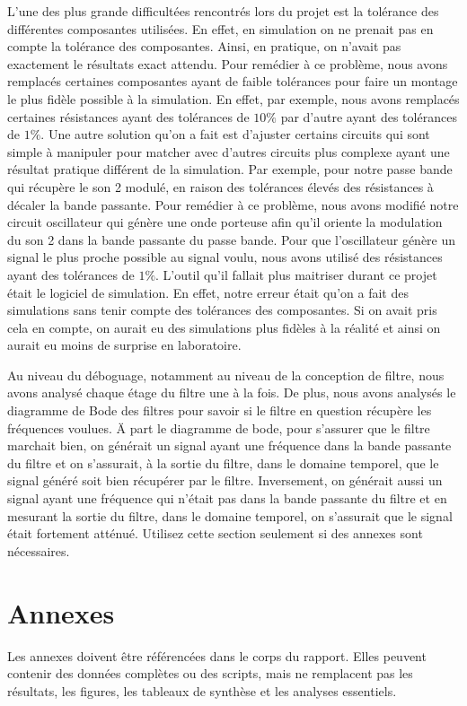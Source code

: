 \documentclass[11pt,letterpaper]{article}
\begin{document}
    L'une des plus grande difficultées rencontrés lors du projet est la tolérance des différentes composantes utilisées. En effet, en simulation on ne prenait pas en 
    compte la tolérance des composantes. Ainsi, en pratique, on n'avait pas exactement le résultats exact attendu. Pour remédier à ce problème, nous avons remplacés certaines composantes 
    ayant de faible tolérances pour faire un montage le plus fidèle possible à la simulation. En effet, par exemple, nous avons remplacés certaines résistances ayant des tolérances de 
    $10\%$ par d'autre ayant des tolérances de $1\%$. Une autre solution qu'on a fait est d'ajuster certains circuits qui sont simple à manipuler pour matcher avec d'autres circuits plus complexe ayant une 
    résultat pratique différent de la simulation. Par exemple, pour notre passe bande qui récupère le son 2 modulé, en raison des tolérances élevés des résistances à décaler la bande passante. Pour remédier à ce problème, 
    nous avons modifié notre circuit oscillateur qui génère une onde porteuse afin qu'il oriente la modulation du son 2 dans la bande passante du passe bande. Pour que l'oscillateur génère un signal le plus
    proche possible au signal voulu, nous avons utilisé des résistances ayant des tolérances de $1\%$. L'outil qu'il fallait plus maitriser durant ce projet était le logiciel de simulation. En effet, 
    notre erreur était qu'on a fait des simulations sans tenir compte des tolérances des composantes. Si on avait pris cela en compte, on aurait eu des simulations plus fidèles à la réalité et ainsi on aurait 
    eu moins de surprise en laboratoire. 

    Au niveau du déboguage, notamment au niveau de la conception de filtre, nous avons analysé chaque étage du filtre une à la fois. De plus, nous avons analysés le diagramme de Bode des filtres pour savoir 
    si le filtre en question récupère les fréquences voulues. Ä part le diagramme de bode, pour s'assurer que le filtre marchait bien, on générait un signal ayant une fréquence dans la bande passante du filtre et on 
    s'assurait, à la sortie du filtre, dans le domaine temporel, que le signal généré soit bien récupérer par le filtre. Inversement, on générait aussi un signal ayant une fréquence qui n'était pas dans la bande passante
    du filtre et en mesurant la sortie du filtre, dans le domaine temporel, on s'assurait que le signal était fortement atténué. 
\clearpage
Utilisez cette section seulement si des annexes sont nécessaires.
\appendix
\section{Annexes}
Les annexes doivent être référencées dans le corps du rapport. Elles peuvent contenir des données complètes ou des scripts, mais ne remplacent pas les résultats, les figures, les tableaux de synthèse et les analyses essentiels.
\end{document}
